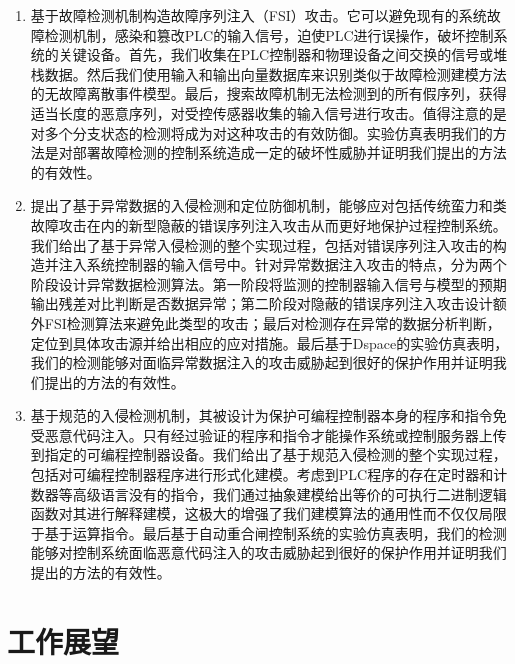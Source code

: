\begin{enumerate}
\item 基于故障检测机制构造故障序列注入（FSI）攻击。它可以避免现有的系统故障检测机制，感染和篡改PLC的输入信号，迫使PLC进行误操作，破坏控制系统的关键设备。首先，我们收集在PLC控制器和物理设备之间交换的信号或堆栈数据。然后我们使用输入和输出向量数据库来识别类似于故障检测建模方法的无故障离散事件模型。最后，搜索故障机制无法检测到的所有假序列，获得适当长度的恶意序列，对受控传感器收集的输入信号进行攻击。值得注意的是对多个分支状态的检测将成为对这种攻击的有效防御。实验仿真表明我们的方法是对部署故障检测的控制系统造成一定的破坏性威胁并证明我们提出的方法的有效性。

\item 提出了基于异常数据的入侵检测和定位防御机制，能够应对包括传统蛮力和类故障攻击在内的新型隐蔽的错误序列注入攻击从而更好地保护过程控制系统。我们给出了基于异常入侵检测的整个实现过程，包括对错误序列注入攻击的构造并注入系统控制器的输入信号中。针对异常数据注入攻击的特点，分为两个阶段设计异常数据检测算法。第一阶段将监测的控制器输入信号与模型的预期输出残差对比判断是否数据异常；第二阶段对隐蔽的错误序列注入攻击设计额外FSI检测算法来避免此类型的攻击；最后对检测存在异常的数据分析判断，定位到具体攻击源并给出相应的应对措施。最后基于Dspace的实验仿真表明，我们的检测能够对面临异常数据注入的攻击威胁起到很好的保护作用并证明我们提出的方法的有效性。

\item 基于规范的入侵检测机制，其被设计为保护可编程控制器本身的程序和指令免受恶意代码注入。只有经过验证的程序和指令才能操作系统或控制服务器上传到指定的可编程控制器设备。我们给出了基于规范入侵检测的整个实现过程，包括对可编程控制器程序进行形式化建模。考虑到PLC程序的存在定时器和计数器等高级语言没有的指令，我们通过抽象建模给出等价的可执行二进制逻辑函数对其进行解释建模，这极大的增强了我们建模算法的通用性而不仅仅局限于基于运算指令。最后基于自动重合闸控制系统的实验仿真表明，我们的检测能够对控制系统面临恶意代码注入的攻击威胁起到很好的保护作用并证明我们提出的方法的有效性。
\end{enumerate}

\section{工作展望} 


